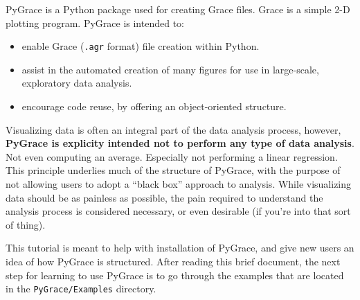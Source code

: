 PyGrace is a Python package used for creating Grace files. Grace is a
simple 2-D plotting program.  PyGrace is intended to:
\begin{itemize}
\item enable Grace ({\tt .agr} format) file creation within Python.
\item assist in the automated creation of many figures for use in
  large-scale, exploratory data analysis.
\item encourage code reuse, by offering an object-oriented structure.
\end{itemize}
Visualizing data is often an integral part of the data analysis
process, however, \textbf{PyGrace is explicity intended not to perform
  any type of data analysis}.  Not even computing an average.
Especially not performing a linear regression.  This principle
underlies much of the structure of PyGrace, with the purpose of not
allowing users to adopt a ``black box'' approach to analysis.  While
visualizing data should be as painless as possible, the pain required
to understand the analysis process is considered necessary, or even
desirable (if you're into that sort of thing).

This tutorial is meant to help with installation of PyGrace, and give
new users an idea of how PyGrace is structured.  After reading this
brief document, the next step for learning to use PyGrace is to go
through the examples that are located in the {\tt PyGrace/Examples}
directory.
